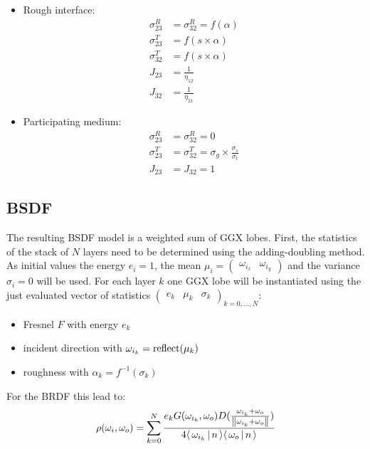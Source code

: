 \begin{itemize}
    \item{
        Rough interface:
        \begin{equation}
            \begin{aligned}
                \sigma_{23}^R &= \sigma_{32}^R = f(\alpha)\\
                \sigma_{23}^T &= f(s \times \alpha)\\
                \sigma_{32}^T &= f(s \times \alpha)\\
                J_{23} &= \frac{1}{\eta_{12}}\\
                J_{32} &= \frac{1}{\eta_{21}}
            \end{aligned}
        \end{equation}
    } 
    \item{
        Participating medium:
        \begin{equation}
            \begin{aligned}
                \sigma_{23}^R &= \sigma_{32}^R = 0\\
                \sigma_{23}^T &= \sigma_{32}^T = \sigma_g \times \frac{\sigma_s}{\sigma_t}\\
                J_{23} &= J_{32} = 1
            \end{aligned}
        \end{equation}
    }
\end{itemize}

\subsection{BSDF}
\label{sec:bsdf}

The resulting BSDF model is a weighted sum of GGX lobes. First, the statistics of the stack of $N$ layers need to be determined using the adding-doubling method. As initial values the energy $e_i = 1$, the mean $\mu_i = \begin{pmatrix}\omega_{i_x} & \omega_{i_y}\end{pmatrix}$ and the variance $\sigma_i = 0$ will be used. For each layer $k$ one GGX lobe will be instantiated using the just evaluated vector of statistics $\begin{pmatrix}e_k & \mu_k & \sigma_k\end{pmatrix}_{k=0,\dots,N}$:
\begin{itemize}
    \item Fresnel $F$ with energy $e_k$
    \item incident direction with $\omega_{i_k} = \operatorname{reflect}(\mu_k)$
    \item roughness with $\alpha_k = f^{-1}(\sigma_k)$
\end{itemize}
For the BRDF this lead to:
\begin{equation}
    \rho(\omega_i, \omega_o) = \sum_{k=0}^{N} \frac{e_k G(\omega_{i_k}, \omega_o) D(\frac{\omega_{i_k}+\omega_o}{\left\lVert\omega_{i_k}+\omega_o\right\rVert })}{4 \dotproduct{\omega_{i_k}}{n} \dotproduct{\omega_o}{n}}
\end{equation}

